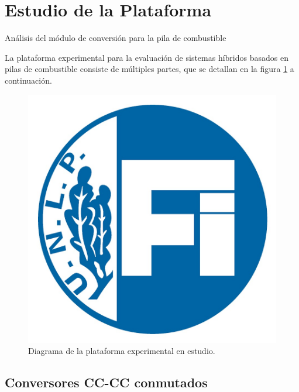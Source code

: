 \section{Estudio de la Plataforma}

\vspace{0.5cm}

\Large\scshape
\begin{center}
    Análisis del módulo de conversión para la pila de combustible
\end{center}
\normalfont

\divider

La plataforma experimental para la evaluación de sistemas híbridos basados en pilas de combustible consiste de múltiples partes, que se detallan en la figura \ref{diag_plataforma} a continuación.

\begin{figure}[H]
    \centering
    \includegraphics[scale=0.25]{Imagenes/FI.jpg}
    \caption{Diagrama de la plataforma experimental en estudio.}
    \label{diag_plataforma}
\end{figure}



\subsection{Conversores CC-CC conmutados}

